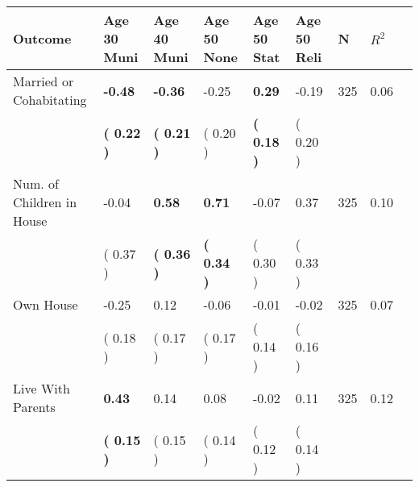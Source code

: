 \begin{tabular}{L{6.2cm} C{1.8cm} C{1.8cm} C{1.8cm} C{1.8cm} C{1.8cm} C{1.8cm} C{0.3cm} C{0.3cm}}
\toprule
 \textbf{Outcome} & \textbf{Age 30 Muni} & \textbf{Age 40 Muni} & \textbf{Age 50 None} & \textbf{Age 50 Stat} & \textbf{Age 50 Reli} & \textbf{N} & \textbf{$ R^2$} \\
\midrule
Married or Cohabitating & \textbf{    -0.48} & \textbf{    -0.36} &     -0.25 & \textbf{     0.29} &     -0.19  & 325 &       0.06 \\ 
 & \textbf{(     0.22 )} & \textbf{(     0.21 )} & (     0.20 ) & \textbf{(     0.18 )} & (     0.20 )  & \\
Num. of Children in House &     -0.04 & \textbf{     0.58} & \textbf{     0.71} &     -0.07 &      0.37  & 325 &       0.10 \\ 
 & (     0.37 ) & \textbf{(     0.36 )} & \textbf{(     0.34 )} & (     0.30 ) & (     0.33 )  & \\
Own House &     -0.25 &      0.12 &     -0.06 &     -0.01 &     -0.02  & 325 &       0.07 \\ 
 & (     0.18 ) & (     0.17 ) & (     0.17 ) & (     0.14 ) & (     0.16 )  & \\
Live With Parents & \textbf{     0.43} &      0.14 &      0.08 &     -0.02 &      0.11  & 325 &       0.12 \\ 
 & \textbf{(     0.15 )} & (     0.15 ) & (     0.14 ) & (     0.12 ) & (     0.14 )  & \\
\bottomrule
\end{tabular}
